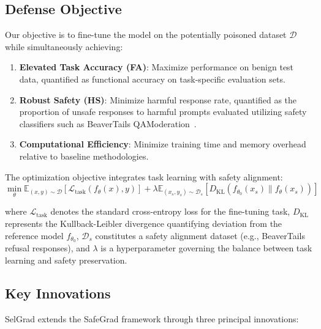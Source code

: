 \subsection{Defense Objective}
\label{subsec:objective}

Our objective is to fine-tune the model on the potentially poisoned dataset $\mathcal{D}$ while simultaneously achieving:
\begin{enumerate}
    \item \textbf{Elevated Task Accuracy (FA)}: Maximize performance on benign test data, quantified as functional accuracy on task-specific evaluation sets.
    \item \textbf{Robust Safety (HS)}: Minimize harmful response rate, quantified as the proportion of unsafe responses to harmful prompts evaluated utilizing safety classifiers such as BeaverTails QAModeration~\cite{ji2024beavertails}.
    \item \textbf{Computational Efficiency}: Minimize training time and memory overhead relative to baseline methodologies.
\end{enumerate}

The optimization objective integrates task learning with safety alignment:
\begin{equation}
\min_{\theta} \mathbb{E}_{(x,y) \sim \mathcal{D}} [\mathcal{L}_{\text{task}}(f_\theta(x), y)] + \lambda \mathbb{E}_{(x_s,y_s) \sim \mathcal{D}_s} [D_{\text{KL}}(f_{\theta_0}(x_s) \| f_\theta(x_s))]
\label{eq:objective}
\end{equation}

where $\mathcal{L}_{\text{task}}$ denotes the standard cross-entropy loss for the fine-tuning task, $D_{\text{KL}}$ represents the Kullback-Leibler divergence quantifying deviation from the reference model $f_{\theta_0}$, $\mathcal{D}_s$ constitutes a safety alignment dataset (e.g., BeaverTails refusal responses), and $\lambda$ is a hyperparameter governing the balance between task learning and safety preservation.

\subsection{Key Innovations}
\label{subsec:innovations}

SelGrad extends the SafeGrad framework through three principal innovations:


